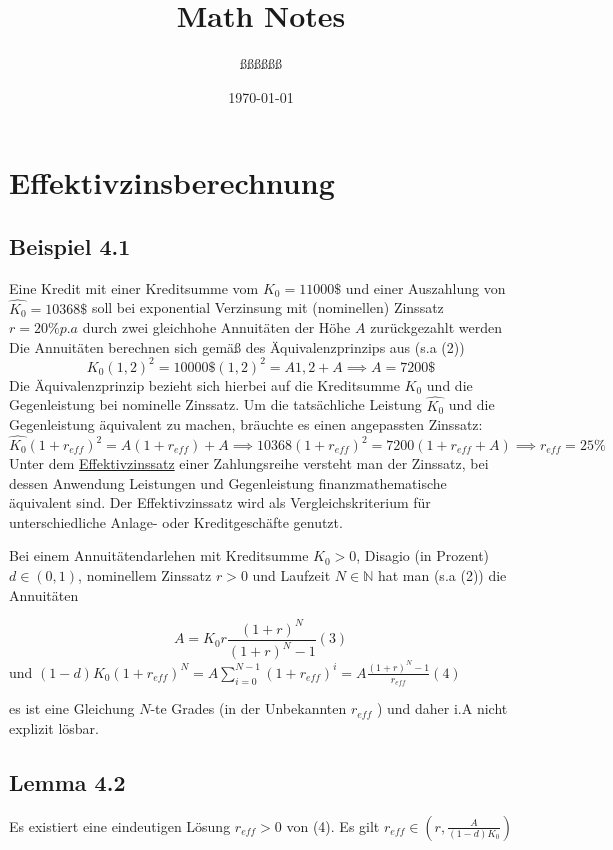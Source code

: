 \documentclass[11pt,a4paper]{article}
\title{Math Notes}
\author{ßßßßßß}
\date{\today}
\theoremstyle{definition}
\theoremstyle{remark}
\begin{document}
\maketitle
\tableofcontents
\newpage

\section*{Effektivzinsberechnung}
\subsection*{Beispiel 4.1}
Eine Kredit mit einer Kreditsumme vom $ K_0 = 11 000 \$ $ und einer Auszahlung von $ \hat{K_0} = 10368 \$ $ soll bei exponential Verzinsung mit (nominellen) Zinssatz $ r = 20 \% p.a $ durch zwei gleichhohe Annuitäten der Höhe $ A $ zurückgezahlt werden \break
Die Annuitäten berechnen sich gemäß des Äquivalenzprinzips aus (s.a (2))
$$ K_0 (1,2)^{2} = 10000\$ (1,2)^{2} = A 1,2 + A \implies A = 7200\$ $$
Die Äquivalenzprinzip bezieht sich hierbei auf die Kreditsumme $ K_0 $ und die Gegenleistung bei nominelle Zinssatz. Um die tatsächliche  Leistung $ \hat{K_0} $ und die Gegenleistung äquivalent zu machen, bräuchte es einen angepassten Zinssatz:
$$ \hat{K_0} \left( 1 + r_{eff} \right)^{2} = A \left( 1 + r_{eff} \right) + A \implies 10368 (1+ r_{eff})^{2} = 7200 ( 1 + r_{eff} +A)\implies r_{eff} = 25\%  $$
Unter dem \underline{Effektivzinssatz} einer Zahlungsreihe versteht man der Zinssatz, bei dessen Anwendung Leistungen und Gegenleistung finanzmathematische äquivalent sind. Der Effektivzinssatz wird als Vergleichskriterium für unterschiedliche Anlage- oder Kreditgeschäfte genutzt. 

Bei einem Annuitätendarlehen mit Kreditsumme $ K_0 > 0 $, Disagio (in Prozent) $ d \in (0,1) $, nominellem Zinssatz $ r > 0 $ und 
Laufzeit $ N \in \mathbb{N} $ hat man (s.a (2)) die Annuitäten

$$
	A = K_0 r \frac{\left( 1 + r \right) ^{N}}{\left( 1 + r \right) ^{N}-1}  (3)
$$
und \begin{math}
	(1-d) K_0 (1 + r_{eff})^{N} = A \sum_{i=0}^{N-1} (1+ r_{eff})^{i} = A \frac{\left( 1 + r \right) ^{N}-1}{r_{eff}} (4)
\end{math}

es ist eine Gleichung $ N $-te Grades (in der Unbekannten $ r_{eff} $ ) und daher i.A nicht explizit lösbar.

\subsection*{Lemma 4.2}
Es existiert eine eindeutigen Lösung $ r_{eff}>0 $ von (4). Es gilt $ r_{eff} \in \left( r, \frac{A}{(1-d)K_0}  \right)  $ 
\end{document}
